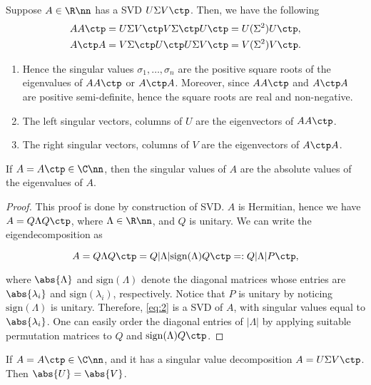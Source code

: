 \documentclass{article}
\def\sign{\mathrm{sign}}
\begin{document}
\begin{lemma} \label{lem:svd-eig} Suppose
$A\in\R\nn$ has a SVD $U\Sigma V\ctp$. Then, we have the following
\begin{align*}
  & AA\ctp = U\Sigma V\ctp V \Sigma\ctp U\ctp = U(\Sigma^2)U\ctp,\\
  & A\ctp A = V\Sigma\ctp U\ctp U\Sigma V\ctp = V(\Sigma^2)V\ctp.
\end{align*}
\begin{enumerate}
\item Hence the singular values $\sigma_1,\dots,\sigma_n$ are the positive
square roots of the eigenvalues of $AA\ctp$ or $A\ctp A$. Moreover, since
$AA\ctp$ and $A\ctp A$ are positive semi-definite, hence the square roots
are real and non-negative.
\item The left singular vectors, columns of $U$ are the eigenvectors of
$AA\ctp$.
\item The right singular vectors, columns of $V$ are the eigenvectors of
$A\ctp A$.
\end{enumerate}
\end{lemma}

\begin{proposition} 
\label{prop:sv=|ev|}
If $A = A\ctp\in \C\nn$, then the singular values of $A$ are the absolute
values of the eigenvalues of $A$.
\end{proposition}

\begin{proof}
This proof is done by construction of SVD. $A$ is Hermitian, hence we have
$A = Q\Lambda Q\ctp$, where $\Lambda\in\R\nn$, and $Q$ is unitary. We can
write the eigendecomposition as

\begin{equation}
  \label{eq:2}
  A = Q\Lambda Q\ctp = Q |\Lambda| \sign(\Lambda) Q\ctp 
  =: Q|\Lambda| P\ctp, 
\end{equation}

where $\abs{\Lambda}$ and $\sign(\Lambda)$ denote the diagonal matrices
whose entries are $\abs{\lambda_i}$ and $\sign(\lambda_i)$, respectively.
Notice that $P$ is unitary by noticing $\sign(\Lambda)$ is unitary.
Therefore, \eqref{eq:2} is a SVD of $A$, with singular values equal to
$\abs{\lambda_i}$. One can easily order the diagonal entries of $|\Lambda|$
by applying suitable permutation matrices to $Q$ and $\sign(\Lambda)Q\ctp$.
\end{proof}

\begin{corollary}
\label{prop:SVD-u=v}
If $A = A\ctp\in \C\nn$, and it has a singular value decomposition
$A = U\Sigma V\ctp$. Then $\abs{U} = \abs{V}$.
\end{corollary}
\end{document}
